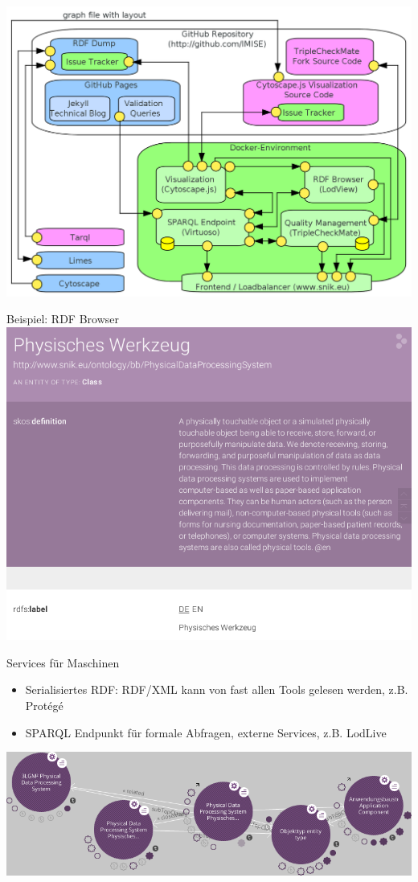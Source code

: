 \documentclass{beamer}
\begin{document}
\begin{frame}
\includegraphics[width=\textwidth]{img/architecture.png}
\end{frame}

\begin{frame}{Beispiel: RDF Browser}
\centering\includegraphics[height=0.8\textheight]{img/browse.png}
\end{frame}

\begin{frame}{Services für Maschinen}
\begin{itemize}
\item Serialisiertes RDF: RDF/XML kann von fast allen Tools gelesen werden, z.B. Protégé
\item SPARQL Endpunkt für formale Abfragen, externe Services, z.B. LodLive   
\end{itemize}
\includegraphics[width=\textwidth]{img/lodlive.png}
\end{frame}
\end{document}
